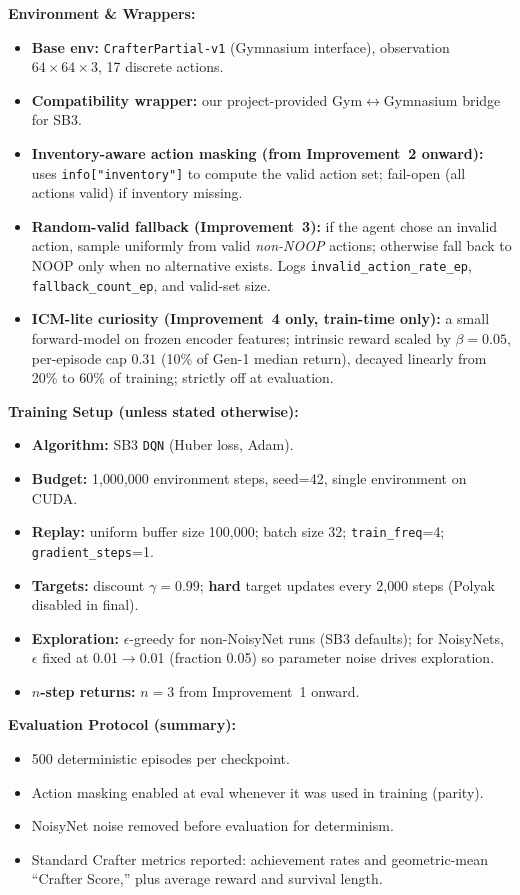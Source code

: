 \documentclass[conference]{IEEEtran}
\begin{document}
\textbf{Environment \& Wrappers:}
\begin{itemize}
    \item \textbf{Base env:} \texttt{CrafterPartial-v1} (Gymnasium interface), observation $64\times64\times3$, 17 discrete actions.
    \item \textbf{Compatibility wrapper:} our project-provided Gym$\leftrightarrow$Gymnasium bridge for SB3.
    \item \textbf{Inventory-aware action masking (from Improvement~2 onward):}
    uses \texttt{info["inventory"]} to compute the valid action set; fail-open (all actions valid) if inventory missing.
    \item \textbf{Random-valid fallback (Improvement~3):} if the agent chose an invalid action, sample uniformly from valid \emph{non-NOOP} actions; otherwise fall back to NOOP only when no alternative exists. Logs \texttt{invalid\_action\_rate\_ep}, \texttt{fallback\_count\_ep}, and valid-set size.
    \item \textbf{ICM-lite curiosity (Improvement~4 only, train-time only):}
    a small forward-model on frozen encoder features; intrinsic reward scaled by $\beta{=}0.05$, per-episode cap $0.31$ (10\% of Gen-1 median return), decayed linearly from 20\% to 60\% of training; strictly off at evaluation.
\end{itemize}

\textbf{Training Setup (unless stated otherwise):}
\begin{itemize}
    \item \textbf{Algorithm:} SB3 \texttt{DQN} (Huber loss, Adam).
    \item \textbf{Budget:} 1{,}000{,}000 environment steps, seed{=}42, single environment on CUDA.
    \item \textbf{Replay:} uniform buffer size 100{,}000; batch size 32; \texttt{train\_freq}{=}4; \texttt{gradient\_steps}{=}1.
    \item \textbf{Targets:} discount $\gamma{=}0.99$; \textbf{hard} target updates every 2{,}000 steps (Polyak disabled in final).
    \item \textbf{Exploration:} $\epsilon$-greedy for non-NoisyNet runs (SB3 defaults); for NoisyNets, $\epsilon$ fixed at 0.01$\rightarrow$0.01 (fraction 0.05) so parameter noise drives exploration.
    \item \textbf{$n$-step returns:} $n{=}3$ from Improvement~1 onward.
\end{itemize}

\textbf{Evaluation Protocol (summary):}
\begin{itemize}
    \item 500 deterministic episodes per checkpoint.
    \item Action masking enabled at eval whenever it was used in training (parity).
    \item NoisyNet noise removed before evaluation for determinism.
    \item Standard Crafter metrics reported: achievement rates and geometric-mean “Crafter Score,” plus average reward and survival length.
\end{itemize}
\end{document}
